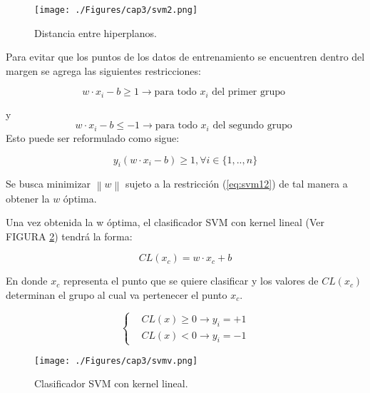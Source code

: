 \begin{figure}[H]
	\centering
		\texttt{[image: ./Figures/cap3/svm2.png]}
	\caption{Distancia entre hiperplanos.}
	\label{fig:svm2}
\end{figure}


Para evitar que los puntos de los datos de entrenamiento se encuentren dentro del margen se agrega las siguientes restricciones:

\begin{equation} \label{eq:svm5}
w\cdot x_i-b\geq 1 \rightarrow  \text{para todo } x_i \text{ del primer grupo }
\end{equation}

y
\begin{equation} \label{eq:svm55}
w\cdot x_i-b\leq -1 \rightarrow  \text{para todo } x_i \text{ del segundo grupo }
\end{equation}
Esto puede ser reformulado como sigue:

\begin{equation} \label{eq:svm12}
y_i(w\cdot x_i-b)\geq 1, \forall i \in \{1,..,n\}
\end{equation}

Se busca minimizar $\left \| w \right \|$ sujeto a la restricción (\ref{eq:svm12}) de tal manera a obtener la $w$ óptima.



Una vez obtenida la w óptima, el clasificador SVM con kernel lineal (Ver FIGURA \ref{fig:svm1}) tendrá la forma:

\begin{equation} \label{eq:svm3}
CL(x_c)=w\cdot x_c +b
\end{equation}


En donde $x_c$ representa el punto que se quiere clasificar y los valores de $CL(x_c)$ determinan el grupo al cual va pertenecer el punto $x_c$.

\begin{equation} \label{eq:svm6}
\begin{cases}
 & CL(x)\geq 0 \rightarrow  y_i=+1\\ 
 & CL(x)<  0 \rightarrow  y_i=-1
\end{cases}
\end{equation}

\begin{figure}[H]
	\centering
		\texttt{[image: ./Figures/cap3/svmv.png]}
	\caption{Clasificador SVM con kernel lineal.}
	\label{fig:svm1}
\end{figure}

